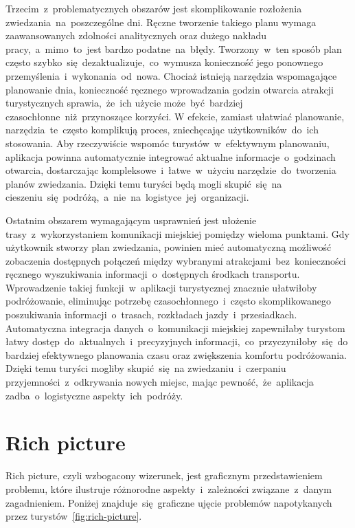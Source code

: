 Trzecim~z~problematycznych obszarów jest skomplikowanie rozłożenia zwiedzania~na~poszczególne dni.
Ręczne tworzenie takiego planu wymaga zaawansowanych zdolności analitycznych oraz dużego nakładu pracy,~a~mimo~to~jest bardzo podatne~na~błędy.
Tworzony~w~ten sposób plan często szybko~się~dezaktualizuje,~co~wymusza konieczność jego ponownego przemyślenia~i~wykonania~od~nowa.
Chociaż istnieją narzędzia wspomagające planowanie dnia, konieczność ręcznego wprowadzania godzin otwarcia atrakcji turystycznych sprawia,~że~ich użycie może~być~bardziej czasochłonne~niż~przynoszące korzyści.
W efekcie, zamiast ułatwiać planowanie, narzędzia~te~często komplikują proces, zniechęcając użytkowników~do~ich stosowania.
Aby rzeczywiście wspomóc turystów~w~efektywnym planowaniu, aplikacja powinna automatycznie integrować aktualne informacje~o~godzinach otwarcia, dostarczając kompleksowe~i~łatwe~w~użyciu narzędzie~do~tworzenia planów zwiedzania.
Dzięki temu turyści będą mogli skupić~się~na cieszeniu~się~podróżą,~a~nie~na~logistyce~jej~organizacji.

Ostatnim obszarem wymagającym usprawnień jest ułożenie trasy~z~wykorzystaniem komunikacji miejskiej pomiędzy wieloma punktami.
Gdy użytkownik stworzy plan zwiedzania, powinien mieć automatyczną możliwość zobaczenia dostępnych połączeń między wybranymi atrakcjami~bez~konieczności ręcznego wyszukiwania informacji~o~dostępnych środkach transportu.
Wprowadzenie takiej funkcji~w~aplikacji turystycznej znacznie ułatwiłoby podróżowanie, eliminując potrzebę czasochłonnego~i~często skomplikowanego poszukiwania informacji~o~trasach, rozkładach jazdy~i~przesiadkach.
Automatyczna integracja danych~o~komunikacji miejskiej zapewniłaby turystom łatwy dostęp~do~aktualnych~i~precyzyjnych informacji,~co~przyczyniłoby~się~do bardziej efektywnego planowania czasu oraz zwiększenia komfortu podróżowania.
Dzięki temu turyści mogliby skupić~się~na zwiedzaniu~i~czerpaniu przyjemności~z~odkrywania nowych miejsc, mając pewność,~że~aplikacja zadba~o~logistyczne aspekty~ich~podróży.

\pagebreak
\section{Rich picture}
\label{sec:rich-picture}

Rich picture, czyli wzbogacony wizerunek, jest graficznym przedstawieniem problemu, które ilustruje różnorodne aspekty~i~zależności związane~z~danym zagadnieniem.
Poniżej znajduje~się~graficzne ujęcie problemów napotykanych przez turystów~\ref{fig:rich-picture}.

